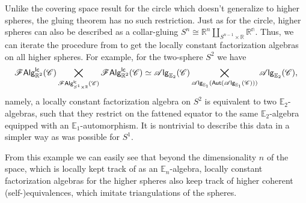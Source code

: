\documentclass[../text]{subfiles}
\begin{document}
\begin{example}\label{ex:lcfas_on_S^n}
    Unlike the covering space result for the circle \cite[sec.5.5]{ginot2015} which doesn't generalize to higher spheres, the gluing theorem has no such restriction. Just as for the circle, higher spheres can also be described as a collar-gluing $S^n \cong \mathbb{R}^n \coprod_{S^{n-1} \times \mathbb{R}} \mathbb{R^n}$. Thus, we can iterate the procedure from  to get the locally constant factorization algebras on all higher spheres. For example, for the two-sphere $S^2$ we have
    \begin{equation}
        \mathscr{F} \mathsf{Alg}^{\mathsf{lc}}_{\mathbb{R}^2}(\mathscr{C}) \bigtimes_{\mathscr{F} \mathsf{Alg}^{\mathsf{lc}}_{S^1 \times \mathbb{R}}(\mathscr{C})} \mathscr{F} \mathsf{Alg}^{\mathsf{lc}}_{\mathbb{R}^2}(\mathscr{C}) \simeq \mathscr{A} \mathsf{lg}_{\mathbb{E}_2}(\mathscr{C}) \bigtimes_{\mathscr{A} \mathsf{lg}_{\mathbb{E}_1}( \mathsf{Aut} (\mathscr{A} \mathsf{lg}_{\mathbb{E}_1} (\mathscr{C}))) } \mathscr{A} \mathsf{lg}_{\mathbb{E}_2} (\mathscr{C}),
    \end{equation}
    namely, a locally constant factorization algebra on $S^2$ is equivalent to two $\mathbb{E}_2$-algebras, such that they restrict on the fattened equator to the same $\mathbb{E}_2$-algebra equipped with an $\mathbb{E}_1$-automorphism. It is nontrivial to describe this data in a simpler way as was possible for $S^1$.
    
    From this example we can easily see that beyond the dimensionality $n$ of the space, which is locally kept track of as an $\mathbb{E}_n$-algebra, locally constant factorization algebras for the higher spheres also keep track of higher coherent (self-)equivalences, which imitate triangulations of the spheres.
\end{example}
\end{document}
